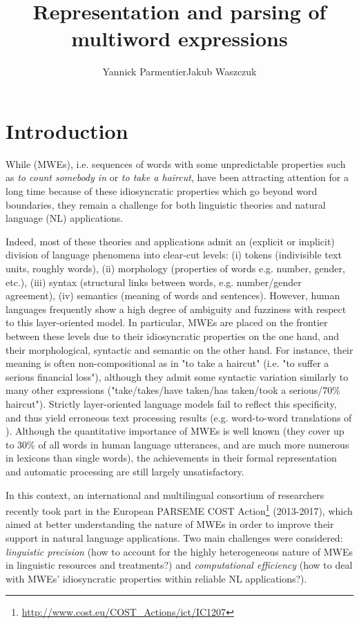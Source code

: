 \documentclass[output=paper]{langsci/langscibook}
\title{Representation and parsing of multiword expressions}
\author{Yannick Parmentier\affiliation{Université d'Orléans}\lastand Jakub Waszczuk\affiliation{Université François Rabelais Tours\\Université d'Orléans}}
\begin{document}
\section{Introduction} 
While  (MWEs), i.e. sequences of words with some
unpredictable properties such as \textit{to count somebody in} or
\textit{to take a haircut}, have been attracting attention for a long
time because of these idiosyncratic properties which go beyond word
boundaries, they remain a challenge for both linguistic theories and
natural language (NL) applications.

Indeed, most of these theories and applications admit an (explicit or
implicit) division of language phenomena into clear-cut levels:
(i) tokens (indivisible text units, roughly words),
(ii) morphology (properties of words e.g. number, gender, etc.),
(iii) syntax (structural links between words, e.g. number/gender agreement),
(iv) semantics (meaning of words and sentences).
However, human languages frequently show a high degree of ambiguity
and fuzziness with respect to this layer-oriented model. In
particular, MWEs are placed on the frontier between these levels due
to their idiosyncratic properties on the one hand, and their
morphological, syntactic and semantic  on the other
hand. For instance, their meaning is often non-compositional as in "to
take a haircut" (i.e. "to suffer a serious financial loss"), although
they admit some syntactic variation similarly to many other
expressions ("take/takes/have taken/has taken/took a serious/70\%
haircut"). Strictly layer-oriented language models fail to reflect
this specificity, and thus yield erroneous text processing results
(e.g. word-to-word translations of ). Although the quantitative
importance of MWEs is well known (they cover up to 30\% of all words
in human language utterances, and are much more numerous in lexicons
than single words), the achievements in their formal representation
and automatic processing are still largely unsatisfactory.

In this context, an international and multilingual consortium of
researchers recently took part in the European PARSEME COST
Action\footnote{\url{http://www.cost.eu/COST_Actions/ict/IC1207}}
(2013-2017), which aimed at better understanding the nature of MWEs in
order to improve their support in natural language applications. Two
main challenges were considered: \emph{linguistic precision} (how to
account for the highly heterogeneous nature of MWEs in linguistic
resources and treatments?) and \emph{computational efficiency} (how to
deal with MWEs' idiosyncratic properties within reliable NL
applications?).
\end{document}
